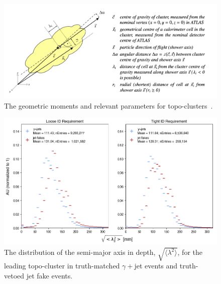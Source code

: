  \begin{figure}[!htbp]
    \centering
    \includegraphics[width=.90\textwidth]{chapters/chapter4_photonID/images/geom-moments.png}

    \caption[The geometric moments and relevant parameters for topo-clusters.]
    {The geometric moments and relevant parameters for topo-clusters~\cite{topo-clustering-r1}.}
    \label{fig:topo-geom}
\end{figure}

 \begin{figure}[!htbp]
    \centering
    \includegraphics[width=\textwidth]{chapters/chapter4_photonID/images/hists/y_topoCluster0_secondLambda.png}
    \caption[The distribution of the semi-major axis in depth, $\sqrt{\langle \lambda^2 \rangle}$, for the leading topo-cluster]{The distribution of the semi-major axis in depth, $\sqrt{\langle \lambda^2 \rangle}$, for the leading topo-cluster in truth-matched $\gamma+$jet events and truth-vetoed jet fake events.}
    \label{fig:topo-secondLambda}

\end{figure}

